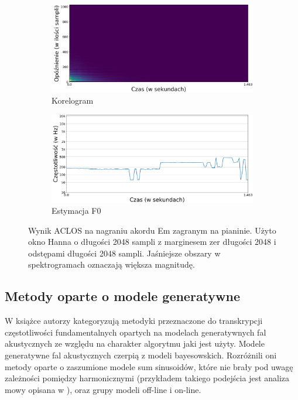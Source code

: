 \documentclass[12pt,a4paper,twoside]{mwart}
\begin{document}
\begin{figure}[H]
  \begin{subfigure}{0.5\textwidth}
    \includegraphics[width=1.\linewidth]{images/Em/Aclos_corelogram_cropped.png}
    \caption{Korelogram}
  \end{subfigure}
  \begin{subfigure}{0.49\textwidth}
    \includegraphics[width=1.\linewidth]{images/Em/Aclos_estymacja_cropped.png}
    \caption{Estymacja F0}
    \label{fig:multi:aclos:estimation}
  \end{subfigure}
  \caption{Wynik ACLOS na nagraniu akordu Em zagranym na pianinie. Użyto okno Hanna o długości 2048 sampli z marginesem zer długości 2048 i odstępami długości 2048 sampli. Jaśniejsze obszary w spektrogramach oznaczają większa magnitudę.}
  \label{fig:multi:aclos}
\end{figure}

\subsection{Metody oparte o modele generatywne}
W książce \cite[203-227]{Transcription:Anssi:SignalProcessingMethods} autorzy kategoryzują metodyki przeznaczone do transkrypcji częstotliwości fundamentalnych opartych na modelach generatywnych fal akustycznych ze względu na charakter algorytmu jaki jest użyty. Modele generatywne fal akustycznych czerpią z modeli bayesowskich. Rozróżnili oni metody oparte o zaszumione modele sum sinusoidów, które nie brały pod uwagę zależności pomiędzy harmonicznymi (przykładem takiego podejścia jest analiza mowy opisana w \cite[744-745]{Transcription:McAulay:SinusoidalRepresentationF0}), oraz grupy modeli off-line i on-line.
\end{document}
